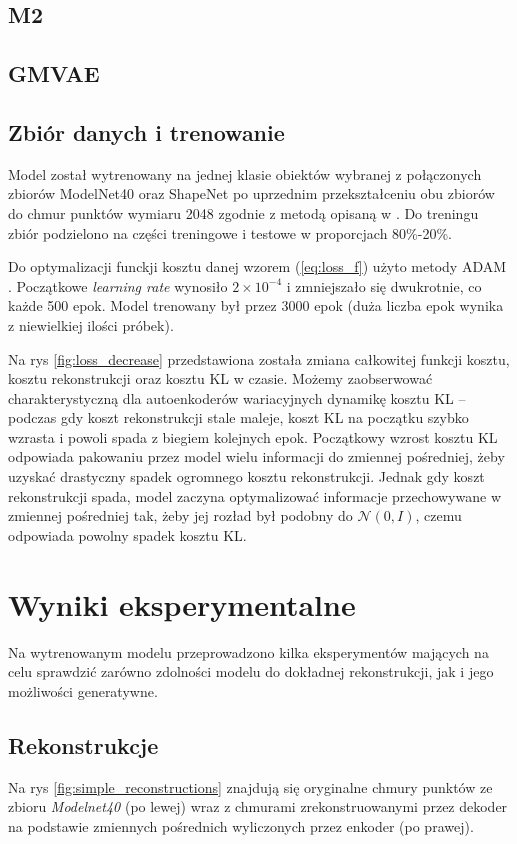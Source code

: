 \documentclass[12pt]{extarticle}
\begin{document}
\subsection{M2}
\subsection{GMVAE}

\subsection{Zbiór danych i trenowanie}
Model został wytrenowany na jednej klasie obiektów wybranej z połączonych zbiorów ModelNet40 \cite{modelnet}
oraz ShapeNet \cite{shapenet} po uprzednim przekształceniu obu zbiorów do chmur punktów wymiaru 2048 
zgodnie z metodą opisaną w \cite{pc_convert_method}. Do treningu zbiór podzielono na części treningowe i testowe
w proporcjach 80\%-20\%.

Do optymalizacji funckji kosztu danej wzorem (\ref{eq:loss_f}) użyto metody ADAM \cite{adam}. Początkowe
\textit{learning rate} wynosiło $2 \times 10^{-4}$ i zmniejszało się dwukrotnie, co każde 500 epok.
Model trenowany był przez 3000 epok (duża liczba epok wynika z niewielkiej ilości próbek).

Na rys \ref{fig:loss_decrease} przedstawiona została zmiana całkowitej funkcji kosztu,
kosztu rekonstrukcji oraz kosztu KL w czasie. Możemy zaobserwować charakterystyczną dla autoenkoderów
wariacyjnych dynamikę kosztu KL -- podczas gdy koszt rekonstrukcji stale maleje, koszt KL na początku
szybko wzrasta i powoli spada z biegiem kolejnych epok. Początkowy wzrost kosztu KL odpowiada pakowaniu
przez model wielu informacji do zmiennej pośredniej, żeby uzyskać drastyczny spadek ogromnego kosztu rekonstrukcji.
Jednak gdy koszt rekonstrukcji spada, model zaczyna optymalizować informacje przechowywane w zmiennej pośredniej
tak, żeby jej rozład był podobny do $\mathcal{N}(0, I)$, czemu odpowiada powolny spadek kosztu KL.

\section{Wyniki eksperymentalne}
Na wytrenowanym modelu przeprowadzono kilka eksperymentów mających na celu sprawdzić zarówno zdolności modelu do dokładnej
rekonstrukcji, jak i jego możliwości generatywne.

\subsection{Rekonstrukcje}
Na rys \ref{fig:simple_reconstructions} znajdują się oryginalne chmury punktów ze zbioru \textit{Modelnet40} (po lewej)
wraz z chmurami zrekonstruowanymi przez dekoder na podstawie zmiennych pośrednich wyliczonych przez enkoder (po prawej).
\end{document}
